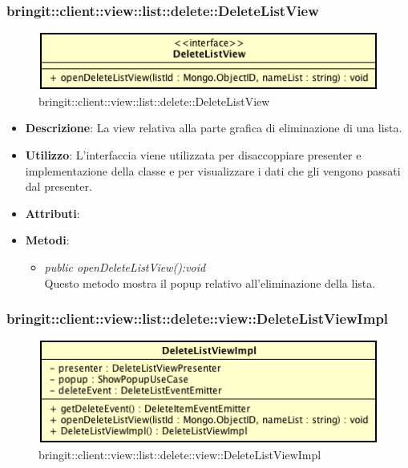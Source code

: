 \subsubsection{bringit::client::view::list::delete::DeleteListView}

\label{bringit::client::view::list::delete::DeleteListView}
\begin{figure}[H]
	\centering
	\includegraphics[scale=0.5]{Sezioni/SottosezioniST/img/app/DeleteListView.png}
	\caption{bringit::client::view::list::delete::DeleteListView}
\end{figure}

\begin{itemize}
\item \textbf{Descrizione}: La view relativa alla parte grafica di eliminazione di una lista.
\item \textbf{Utilizzo}: L'interfaccia viene utilizzata per disaccoppiare presenter e implementazione della classe e per visualizzare i dati che gli vengono passati dal presenter.
\item \textbf{Attributi}: 
\item \textbf{Metodi}:
	\begin{itemize}
	\item \textit{public openDeleteListView():void}\\
	Questo metodo mostra il popup relativo all'eliminazione della lista.
	\end{itemize}
\end{itemize} 

\subsubsection{bringit::client::view::list::delete::view::DeleteListViewImpl}

\label{bringit::client::view::list::delete::view::DeleteListViewImpl}
\begin{figure}[H]
	\centering
	\includegraphics[scale=0.5]{Sezioni/SottosezioniST/img/app/DeleteListViewImpl.png}
	\caption{bringit::client::view::list::delete::view::DeleteListViewImpl}
\end{figure}

